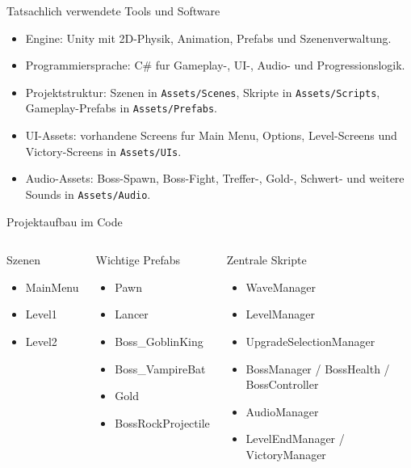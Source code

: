 \documentclass[aspectratio=169]{beamer}
\begin{document}
\begin{frame}{Tatsachlich verwendete Tools und Software}
  \begin{itemize}
    \item Engine: Unity mit 2D-Physik, Animation, Prefabs und Szenenverwaltung.
    \item Programmiersprache: C\# fur Gameplay-, UI-, Audio- und Progressionslogik.
    \item Projektstruktur: Szenen in \texttt{Assets/Scenes}, Skripte in \texttt{Assets/Scripts}, Gameplay-Prefabs in \texttt{Assets/Prefabs}.
    \item UI-Assets: vorhandene Screens fur Main Menu, Options, Level-Screens und Victory-Screens in \texttt{Assets/UIs}.
    \item Audio-Assets: Boss-Spawn, Boss-Fight, Treffer-, Gold-, Schwert- und weitere Sounds in \texttt{Assets/Audio}.
  \end{itemize}
\end{frame}

\begin{frame}{Projektaufbau im Code}
  \begin{columns}[T]
    \begin{block}{Szenen}
      \begin{itemize}
        \item MainMenu
        \item Level1
        \item Level2
      \end{itemize}
    \end{block}

    \begin{block}{Wichtige Prefabs}
      \begin{itemize}
        \item Pawn
        \item Lancer
        \item Boss\_GoblinKing
        \item Boss\_VampireBat
        \item Gold
        \item BossRockProjectile
      \end{itemize}
    \end{block}

    \begin{block}{Zentrale Skripte}
      \begin{itemize}
        \item WaveManager
        \item LevelManager
        \item UpgradeSelectionManager
        \item BossManager / BossHealth / BossController
        \item AudioManager
        \item LevelEndManager / VictoryManager
      \end{itemize}
    \end{block}
  \end{columns}
\end{frame}
\end{document}
